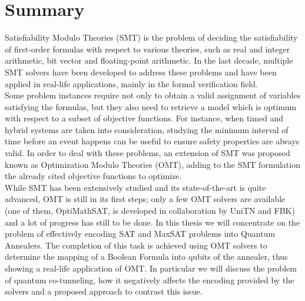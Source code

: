 \chapter*{Summary} %
\label{sommario}

Satisfiability Modulo Theories (SMT) is the problem of deciding the satisfiability of first-order formulas with respect to various theories, such as real and integer arithmetic, bit vector and floating-point arithmetic. In the last decade, multiple SMT solvers have been developed to address these problems and have been applied in real-life applications, mainly in the formal verification field. \\
Some problem instances require not only to obtain a valid assignment of variables satisfying the formulas, but they also need to retrieve a model which is optimum with respect to a subset of objective functions. For instance, when timed and hybrid systems are taken into consideration, studying the minimum interval of time before an event happens can be useful to ensure safety properties are always valid. In order to deal with these problems, an extension of SMT was proposed known as Optimization Modulo Theories (OMT), adding to the SMT formulation the already cited objective functions to optimize. \\
While SMT has been extensively studied and its state-of-the-art is quite advanced, OMT is still in its first steps; only a few OMT solvers are available (one of them, OptiMathSAT, is developed in collaboration by UniTN and FBK) and a lot of progress has still to be done. In this thesis we will concentrate on the problem of effectively encoding SAT and MaxSAT problems into Quantum Annealers. The completion of this task is achieved using OMT solvers to determine the mapping of a Boolean Formula into qubits of the annealer, thus showing a real-life application of OMT. In particular we will discuss the problem of quantum co-tunneling, how it negatively affects the encoding provided by the solvers and a proposed approach to contrast this issue. \\

\newpage






